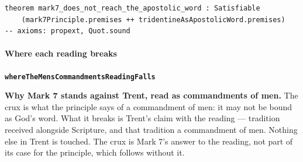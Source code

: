 \documentclass[11pt]{article}
\begin{document}
{\small\begin{verbatim}
theorem mark7_does_not_reach_the_apostolic_word : Satisfiable
    (mark7Principle.premises ++ tridentineAsApostolicWord.premises)
-- axioms: propext, Quot.sound
\end{verbatim}}
\paragraph*{Where each reading breaks}
\leavevmode\par\nobreak
\par\medskip\noindent\textbf{\texttt{where\allowbreak{}The\allowbreak{}Mens\allowbreak{}Commandments\allowbreak{}Reading\allowbreak{}Falls}}\par\nobreak\noindent
\textbf{Why Mark 7 stands against Trent, read as commandments of men.} The crux is what the principle says of a commandment of men: it may not be bound as God’s word. What it breaks is Trent’s claim with the reading — tradition received alongside Scripture, and that tradition a commandment of men. Nothing else in Trent is touched. The crux is Mark 7’s answer to the reading, not part of its case for the principle, which follows without it.
\end{document}
